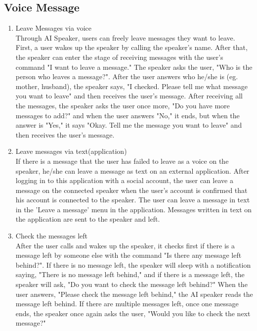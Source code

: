 \documentclass[conference]{IEEEtran}
\begin{document}
\subsection{Voice Message}
\begin{enumerate}
    \item Leave Messages via voice\\
    Through AI Speaker, users can freely leave messages they want to leave. First, a user wakes up the speaker by calling the speaker's name. After that, the speaker can enter the stage of receiving messages with the user's command "I want to leave a message." The speaker asks the user, "Who is the person who leaves a message?". After the user answers who he/she is (eg. mother, husband), the speaker says, "I checked. Please tell me what message you want to leave" and then receives the user's message. After receiving all the messages, the speaker asks the user once more, "Do you have more messages to add?" and when the user answers "No," it ends, but when the answer is "Yes," it says "Okay. Tell me the message you want to leave" and then receives the user's message.\\
    \item Leave messages via text(application)\\
    If there is a message that the user has failed to leave as a voice on the speaker, he/she can leave a message as text on an external application. After logging in to this application with a social account, the user can leave a message on the connected speaker when the user's account is confirmed that his account is connected to the speaker. The user can leave a message in text in the 'Leave a message' menu in the application. Messages written in text on the application are sent to the speaker and left.\\
    \item Check the messages left\\
    After the user calls and wakes up the speaker, it checks first if there is a message left by someone else with the command "Is there any message left behind?". If there is no message left, the speaker will sleep with a notification saying, "There is no message left behind," and if there is a message left, the speaker will ask, "Do you want to check the message left behind?" When the user answers, "Please check the message left behind," the AI speaker reads the message left behind. If there are multiple messages left, once one message ends, the speaker once again asks the user, "Would you like to check the next message?"\\
\end{enumerate}
\end{document}
